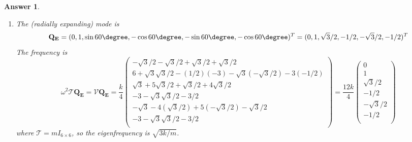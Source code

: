\documentclass[a4paper]{article}
\newtheorem{ans}{Answer}[section]
\theoremstyle{new}
\begin{document}
\begin{ans}
\begin{enumerate}[label=(\roman*)]
 $$\mathcal{V}\mathbf{Q_x}=\frac{k}{4}\begin{pmatrix}2-1-1\\\sqrt{3}-\sqrt{3}\\-1+5-4\\\sqrt{3}-\sqrt{3}\\-1-4+5\\-\sqrt{3}+\sqrt{3}\\\end{pmatrix}=\boldsymbol{0},\quad V\mathbf{Q_y}=\frac{k}{4}\begin{pmatrix}\sqrt{3}-\sqrt{3}\\6-3-3\\-1+5-4\\\sqrt{3}-\sqrt{3}\\-3+3\\-\sqrt{3}+\sqrt{3}\\\end{pmatrix}=\boldsymbol{0}$$
 Since $\mathcal{V}\mathbf{Q}=\omega^2T\mathbf{Q}$, then $\omega$ for $\mathbf{Q_R},\mathbf{Q_x},\mathbf{Q_y}$ is zero.
 \item The (radially expanding) mode is $$\mathbf{Q_E}=(0,1,\sin60\degree,-\cos60\degree,-\sin60\degree,-\cos60\degree)^T=(0,1,\sqrt{3}/2,-1/2,-\sqrt{3}/2,-1/2)^T$$ The frequency is
 $$\omega^2\mathcal{T}\mathbf{Q_E}=\mathcal{V}\mathbf{Q_E}=\frac{k}{4}\begin{pmatrix}-\sqrt{3}/2-\sqrt{3}/2+\sqrt{3}/2+\sqrt{3}/2\\6+\sqrt{3}\sqrt{3}/2-(1/2)(-3)-\sqrt{3}(-\sqrt{3}/2)-3(-1/2)\\\sqrt{3}+5\sqrt{3}/2+\sqrt{3}/2+4\sqrt{3}/2\\-3-\sqrt{3}\sqrt{3}/2-3/2\\-\sqrt{3}-4(\sqrt{3}/2)+5(-\sqrt{3}/2)-\sqrt{3}/2\\-3-\sqrt{3}\sqrt{3}/2-3/2\\\end{pmatrix}=\frac{12k}{4}\begin{pmatrix}0\\1\\\sqrt{3}/2\\-1/2\\-\sqrt{3}/2\\-1/2\\\end{pmatrix}$$
 where $\mathcal{T}=mI_{6\times 6}$,  so the eigenfrequency is $\sqrt{3k/m}$.
\end{enumerate}
\end{ans}
\newpage
\end{document}
